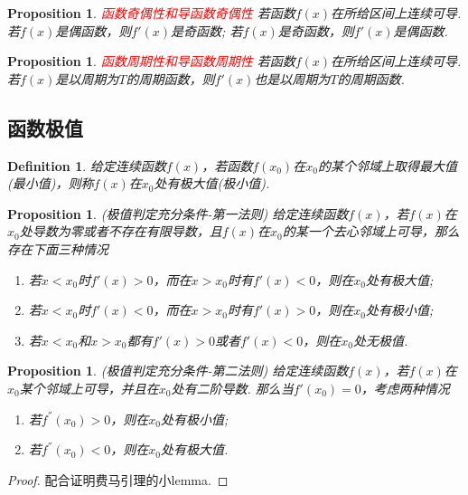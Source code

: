\documentclass{article}
\newtheorem{proposition}[theorem]{Proposition}
\newtheorem{definition}[theorem]{Definition}
\newcommand{\redt}[1]{\textcolor{red}{#1}}
\begin{document}
\begin{proposition}
\rm \redt{函数奇偶性和导函数奇偶性} 若函数$f(x)$在所给区间上连续可导. 若$f(x)$是偶函数，则$f'(x)$是奇函数; 若$f(x)$是奇函数，则$f'(x)$是偶函数.
\end{proposition}

\begin{proposition}
\rm \redt{函数周期性和导函数周期性}  若函数$f(x)$在所给区间上连续可导.  若$f(x)$是以周期为$T$的周期函数，则$f'(x)$也是以周期为$T$的周期函数. 
\end{proposition}

\subsection{函数极值}

\begin{definition}
\rm 给定连续函数$f(x)$，若函数$f(x_0)$在$x_0$的某个邻域上取得最大值(最小值)，则称$f(x)$在$x_0$处有{\color{red}极大值(极小值)}.
\end{definition}

\begin{proposition}
\rm {\color{red} (极值判定充分条件-第一法则)} \rm 给定连续函数$f(x)$，若$f(x)$在$x_0$处导数为零或者不存在有限导数，且$f(x)$在$x_0$的某一个去心邻域上可导，那么存在下面三种情况
\begin{enumerate}
	\item 若$x < x_0$时$f'(x) > 0$，而在$x > x_0$时有$f'(x) < 0$，则在$x_0$处有极大值;
	\item 若$x < x_0$时$f'(x) < 0$，而在$x > x_0$时有$f'(x) > 0$，则在$x_0$处有极小值;
	\item 若$x < x_0$和$x > x_0$都有$f'(x) > 0$或者$f'(x) < 0$，则在$x_0$处无极值.
\end{enumerate}
\end{proposition}


\begin{proposition}
\rm {\color{red} (极值判定充分条件-第二法则)} \rm 给定连续函数$f(x)$，若$f(x)$在$x_0$某个邻域上可导，并且在$x_0$处有二阶导数. 那么当$f'(x_0) = 0$，考虑两种情况
\begin{enumerate}
	\item 若$f^{''}(x_0) > 0$，则在$x_0$处有极小值;
	\item 若$f^{''}(x_0) < 0$，则在$x_0$处有极大值.
\end{enumerate}
\end{proposition}

\begin{proof}
配合证明费马引理的小lemma. 
\end{proof}
\end{document}
